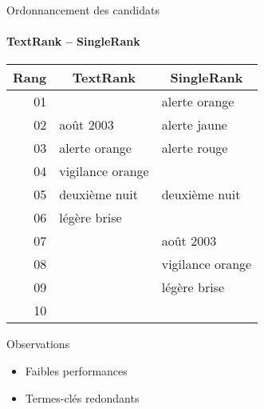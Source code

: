   \begin{frame}{Ordonnancement des candidats}\framesubtitle{TextRank -- SingleRank}
    \begin{table}
      \centering
      \begin{tabular}{r|l|l}
        \toprule
        \textbf{Rang} & \multicolumn{1}{c|}{\textbf{TextRank}} & \multicolumn{1}{c}{\textbf{SingleRank}} \\
        \hline
        01 & \cellcolor{termithorange!30}{août 2012} & alerte orange \\
        02 & août 2003 & alerte jaune \\
        03 & alerte orange & alerte rouge \\
        04 & vigilance orange & \cellcolor{termithorange!30}{alerte} \\
        05 & deuxième nuit & deuxième nuit \\
        06 & légère brise & \cellcolor{termithorange!30}{août 2012} \\
        07 & & août 2003 \\
        08 & & vigilance orange \\
        09 & & légère brise \\
        10 & & \cellcolor{termithorange!30}{Luxembourg} \\
        \bottomrule
      \end{tabular}
    \end{table}

    \vspace{1em}

    \begin{block}{Observations}
      \begin{itemize}
        \item{Faibles performances}
        \item{Termes-clés redondants}
      \end{itemize}
    \end{block}
  \end{frame}

